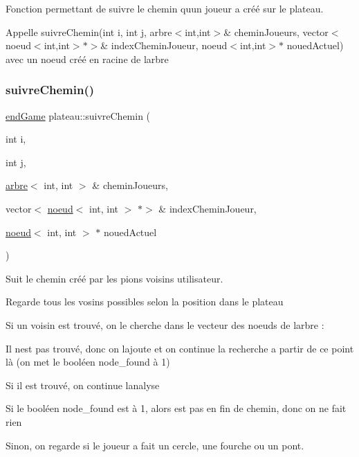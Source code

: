 Fonction permettant de suivre le chemin qu\textquotesingle{}un joueur a créé sur le plateau. 

Appelle suivre\+Chemin(int i, int j, arbre$<$int,int$>$\& chemin\+Joueurs, vector$<$noeud$<$int,int$>$$\ast$$>$\& index\+Chemin\+Joueur, noeud$<$int,int$>$$\ast$ noued\+Actuel) avec un noeud créé en racine de l\textquotesingle{}arbre \mbox{\label{classplateau_a1128f1aaf7cb50cabec306d3171858b5}} 
\subsubsection{\texorpdfstring{suivre\+Chemin()}{suivreChemin()}\hspace{0.1cm}{\footnotesize\ttfamily [2/2]}}
{\footnotesize\ttfamily \hyperlink{classplateau_a94b54e0a84c850657a83176f812db222}{end\+Game} plateau\+::suivre\+Chemin (\begin{DoxyParamCaption}\item[{int}]{i,  }\item[{int}]{j,  }\item[{\hyperlink{classarbre}{arbre}$<$ int, int $>$ \&}]{chemin\+Joueurs,  }\item[{vector$<$ \hyperlink{classnoeud}{noeud}$<$ int, int $>$ $\ast$$>$ \&}]{index\+Chemin\+Joueur,  }\item[{\hyperlink{classnoeud}{noeud}$<$ int, int $>$ $\ast$}]{noued\+Actuel }\end{DoxyParamCaption})}



Suit le chemin créé par les pions voisins utilisateur. 


\begin{DoxyItemize}
\item Regarde tous les vosins possibles selon la position dans le plateau
\item Si un voisin est trouvé, on le cherche dans le vecteur des noeuds de l\textquotesingle{}arbre \+:
\begin{DoxyItemize}
\item Il n\textquotesingle{}est pas trouvé, donc on l\textquotesingle{}ajoute et on continue la recherche a partir de ce point là (on met le booléen node\+\_\+found à 1)
\item Si il est trouvé, on continue l\textquotesingle{}analyse
\end{DoxyItemize}
\item Si le booléen node\+\_\+found est à 1, alors est pas en fin de chemin, donc on ne fait rien
\item Sinon, on regarde si le joueur a fait un cercle, une fourche ou un pont. 
\end{DoxyItemize}


